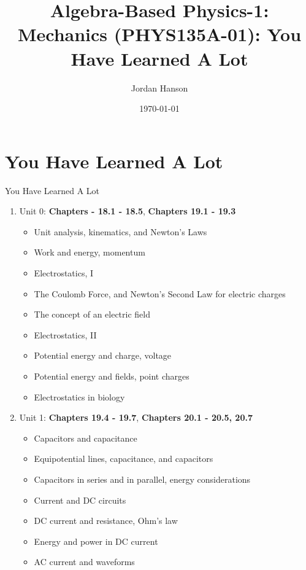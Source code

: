 \documentclass{beamer}
\title{Algebra-Based Physics-1: Mechanics (PHYS135A-01): You Have Learned A Lot}
\date{\today}
\author{Jordan Hanson}
\institute{Whittier College Department of Physics and Astronomy}
\begin{document}
\maketitle

\section{You Have Learned A Lot}

\begin{frame}{You Have Learned A Lot}
\scriptsize
\begin{enumerate}
\scriptsize
\item Unit 0: \textbf{Chapters - 18.1 - 18.5}, \textbf{Chapters 19.1 - 19.3}
\begin{itemize}
\scriptsize
\item Unit analysis, kinematics, and Newton's Laws
\item Work and energy, momentum
\item Electrostatics, I
\item The Coulomb Force, and Newton's Second Law for electric charges
\item The concept of an electric field
\item Electrostatics, II
\item Potential energy and charge, voltage
\item Potential energy and fields, point charges
\item Electrostatics in biology
\end{itemize}
\scriptsize
\item Unit 1: \textbf{Chapters 19.4 - 19.7}, \textbf{Chapters 20.1 - 20.5, 20.7}
\begin{itemize}
\scriptsize
\item Capacitors and capacitance
\item Equipotential lines, capacitance, and capacitors
\item Capacitors in series and in parallel, energy considerations
\item Current and DC circuits
\item DC current and resistance, Ohm's law
\item Energy and power in DC current
\item AC current and waveforms
\end{itemize}
\end{enumerate}
\end{frame}
\end{document}
